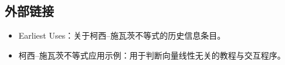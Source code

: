 \subsection{外部链接}
\begin{itemize}
\item Earliest Uses：关于柯西–施瓦茨不等式的历史信息条目。
\item 柯西–施瓦茨不等式应用示例：用于判断向量线性无关的教程与交互程序。
\end{itemize}


